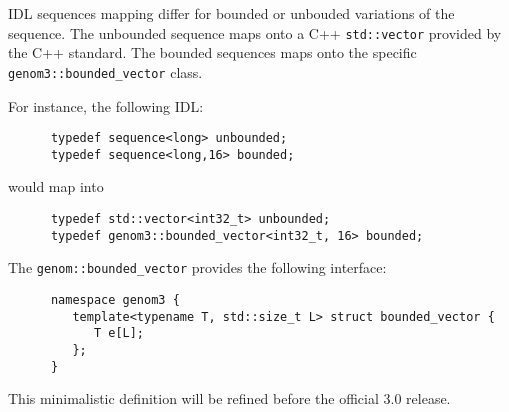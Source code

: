 \GenoM{} IDL sequences mapping differ for bounded or unbouded variations of the
sequence. The unbounded sequence maps  onto a C++ {\tt std::vector} provided by
the  C++  standard.   The  bounded  sequences  maps  onto   the  specific  {\tt
genom3::bounded\_vector} class.

For instance, the following IDL:
\begin{verbatim}
      typedef sequence<long> unbounded;
      typedef sequence<long,16> bounded;
\end{verbatim}

would map into
\begin{verbatim}
      typedef std::vector<int32_t> unbounded;
      typedef genom3::bounded_vector<int32_t, 16> bounded;
\end{verbatim}

The {\tt genom::bounded\_vector} provides the following interface:
\begin{verbatim}
      namespace genom3 {
         template<typename T, std::size_t L> struct bounded_vector {
            T e[L];
         };
      }
\end{verbatim}

This minimalistic definition will be refined before the official 3.0 \GenoM{}
release.
